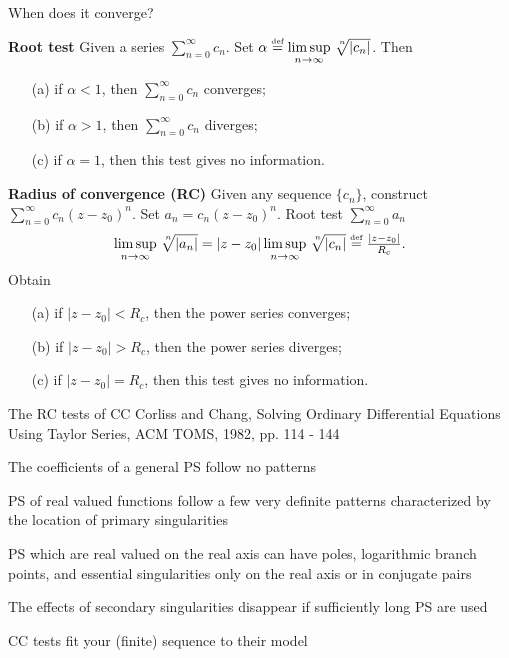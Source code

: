 \documentclass[11pt,svgnames,fleqn]{beamer}
\newcommand{\NC}[1]{{\color{red}#1}}
\newcommand{\DM}[1]{\begin{displaymath} {#1} \end{displaymath}}
\newcommand{\defeq}{\stackrel{\textup{\tiny def}}{=}}
\newcommand{\Setbg}[1]{\bigl\{ {#1} \bigr\}}
\newcommand{\nlimsup}[1]{\limsup\limits_{{#1} \rightarrow \infty}}
\newcommand{\proot}[2]{\sqrt[\leftroot{-3}\uproot{3}{#1}]{#2}}
\begin{document}
\begin{frame}{When does it converge?}

  {\bf Root test}
Given a series $\sum_{n=0}^{\infty} c_n$. Set $\alpha \defeq \nlimsup{n} \proot{n}{|c_n|}$. Then
  \begin{itemize}
    \item[(a)] if $\alpha < 1$, then $\sum_{n=0}^{\infty} c_n$ converges;
    \item[(b)] if $\alpha > 1$, then $\sum_{n=0}^{\infty} c_n$ diverges;
    \item[(c)] if $\alpha = 1$, then this test gives no information.
  \end{itemize}

\vspace{2mm}

  {\bf Radius of convergence (RC)}
  \NC{Given any sequence $\Setbg{c_n}$}, construct
$\sum_{n=0}^{\infty} c_n (z-z_0)^n$. Set $a_n = c_n (z - z_0)^n$. Root test $\sum_{n=0}^{\infty} a_n$
\DM
{
  \nlimsup{n} \proot{n}{|a_n|} = |z-z_0| \nlimsup{n} \proot{n}{|c_n|} \defeq \tfrac{|z-z_0|}{R_c}.
}
Obtain
\begin{itemize}
  \item[(a)] if $|z-z_0| < R_c$, then the power series converges;
  \item[(b)] if $|z-z_0| > R_c$, then the power series diverges;
  \item[(c)] if $|z-z_0| = R_c$, then this test gives no information.
\end{itemize}
\end{frame}



\begin{frame}{The RC tests of CC}
{Corliss and Chang, Solving Ordinary Differential Equations 
  Using Taylor Series, ACM TOMS, 1982, pp. 114 - 144}

The coefficients of a general PS follow no patterns

\vspace{3mm}

  PS of real valued functions follow \NC{a few very definite patterns characterized by the
  location of primary singularities}

\vspace{3mm}

PS which are real valued on the real axis can have poles, logarithmic branch points, and essential singularities only on the real axis or in conjugate pairs

\vspace{3mm}

The effects of secondary singularities disappear if sufficiently long PS are used

\vspace{3mm}

  CC tests \NC{fit} your (finite) sequence to their model

\end{frame}
\end{document}
